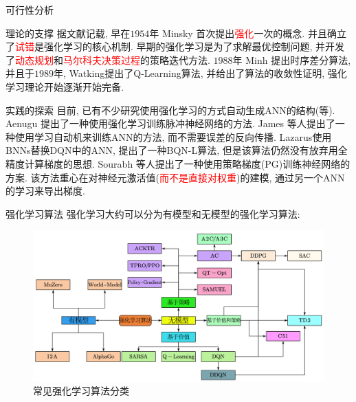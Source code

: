 \documentclass{beamer}
\begin{document}
\begin{frame}{可行性分析}
    \footnotesize
    \begin{textbox}{理论的支撑}
        据文献\cite{1998Reinforcement}记载, 早在$1954$年 Minsky \footnotemark 首次提出\textcolor{red}{强化}一次的概念. 并且确立了\textcolor{red}{试错}是强化学习的核心机制. 早期的强化学习是为了求解最优控制问题, 并开发了\textcolor{red}{动态规划}和\textcolor{red}{马尔科夫决策过程}的策略迭代方法. $1988$年 Minh 提出时序差分算法\cite{mnih2015human}, 并且于$1989$年, Watking提出了Q-Learning\cite{watkins1992q}算法, 并给出了算法的收敛性证明, 强化学习理论开始逐渐开始完备.
    \end{textbox}
    \begin{textbox}{实践的探索}
        目前, 已有不少研究使用强化学习的方式自动生成ANN的结构(\cite{jaques2017tuning, baker2016designing, zoph2016neural}等). Aenugu 提出了一种使用强化学习训练脉冲神经网络的方法\cite{aenugu2020training}. James 等人提出了一种使用学习自动机\cite{lindsay2020novel}来训练ANN的方法, 而不需要误差的反向传播. Lazarus\cite{lazarus2022deep}使用BNNs替换DQN中的ANN, 提出了一种BQN-L算法, 但是该算法仍然没有放弃用全精度计算梯度的思想. Sourabh 等人提出了一种使用策略梯度(PG)训练神经网络的方案\cite{2017Training}. 该方法重心在对神经元激活值(\textcolor{red}{而不是直接对权重})的建模, 通过另一个ANN的学习来导出梯度. 
    \end{textbox}
\end{frame}


\begin{frame}{强化学习算法}
    \footnotesize
    强化学习大约可以分为有模型和无模型的强化学习算法:
    \begin{figure}
        \centering
        \includegraphics[scale=0.3]{pic/ags.pdf}
        \caption{常见强化学习算法分类}
    \end{figure}

\end{frame}
\end{document}
